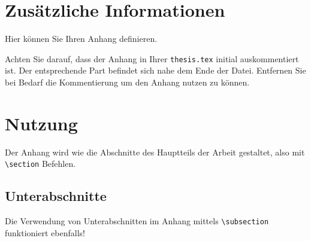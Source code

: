 \section{Zusätzliche Informationen}

Hier können Sie Ihren Anhang definieren.

Achten Sie darauf, dass der Anhang in Ihrer \texttt{thesis.tex}
initial auskommentiert ist.
Der entsprechende Part befindet sich nahe dem Ende der Datei.
Entfernen Sie bei Bedarf die Kommentierung um den Anhang nutzen zu können.


\section{Nutzung}

Der Anhang wird wie die Abschnitte des Hauptteils der Arbeit gestaltet,
also mit \texttt{\textbackslash section} Befehlen.

  \subsection{Unterabschnitte}
  Die Verwendung von Unterabschnitten im Anhang
  mittels \texttt{\textbackslash subsection}
  funktioniert ebenfalls!
